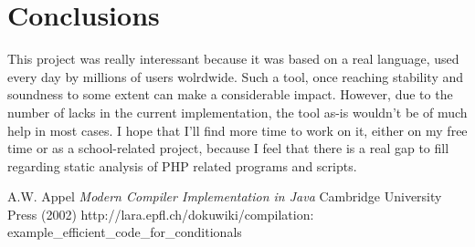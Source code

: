 \documentclass[a4paper]{article}
\begin{document}
\section{Conclusions}
This project was really interessant because it was based on a real language, used
every day by millions of users wolrdwide. Such a tool, once reaching stability
and soundness to some extent can make a considerable impact. However, due to the
number of lacks in the current implementation, the tool as-is wouldn't be of
much help in most cases. I hope that I'll find more time to work on it, either
on my free time or as a school-related project, because I feel that there is a
real gap to fill regarding static analysis of PHP related programs and scripts.

\begin{thebibliography}{99}
  A.W. Appel {\it Modern Compiler Implementation in Java}
    Cambridge University Press (2002)
  \mbox{http://lara.epfl.ch/dokuwiki/compilation:} \mbox{example\_efficient\_code\_for\_conditionals}
\end{thebibliography}
\end{document}

